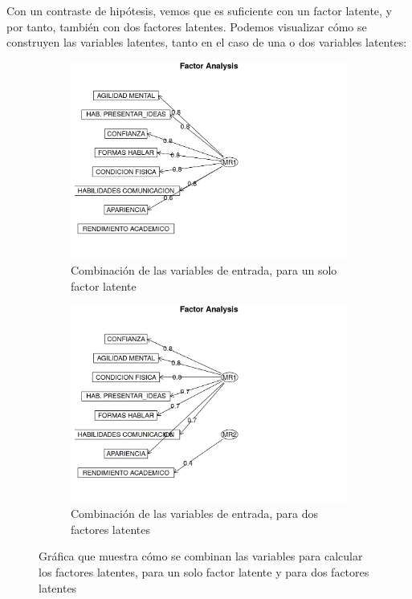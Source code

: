 \documentclass[11pt]{article}
\begin{document}
Con un contraste de hipótesis, vemos que es suficiente con un factor latente, y por tanto, también con dos factores latentes. Podemos visualizar cómo se construyen las variables latentes, tanto en el caso de una o dos variables latentes:

\begin{figure}[H]
    \centering
    \begin{subfigure}{0.45\textwidth}
        \includegraphics[width=1.0\textwidth]{var_latentes_uno}
        \caption{Combinación de las variables de entrada, para un solo factor latente}
    \end{subfigure}
    \begin{subfigure}{0.45\textwidth}
        \includegraphics[width=1.0\textwidth]{var_latentes_dos}
        \caption{Combinación de las variables de entrada, para dos factores latentes}
    \end{subfigure}

    \caption{Gráfica que muestra cómo se combinan las variables para calcular los factores latentes, para un solo factor latente y para dos factores latentes}
\end{figure}
\end{document}
